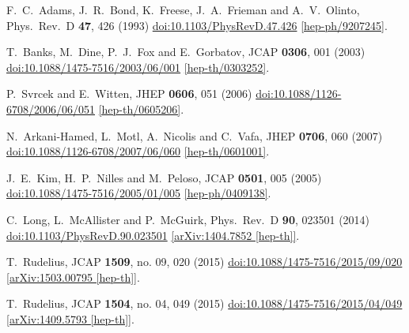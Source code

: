 \documentclass[12pt]{article}
\begin{document}
\begin{thebibliography}{99}
  F.~C.~Adams, J.~R.~Bond, K.~Freese, J.~A.~Frieman and A.~V.~Olinto,
  Phys.\ Rev.\ D {\bf 47}, 426 (1993)
  \href{https://dx.doi.org/10.1103/PhysRevD.47.426}{doi:10.1103/PhysRevD.47.426}
  \href{https://arxiv.org/abs/hep-ph/9207245}{[hep-ph/9207245]}.

  T.~Banks, M.~Dine, P.~J.~Fox and E.~Gorbatov,
  JCAP {\bf 0306}, 001 (2003)
  \href{https://dx.doi.org/10.1088/1475-7516/2003/06/001}{doi:10.1088/1475-7516/2003/06/001}
  \href{https://arxiv.org/abs/hep-th/0303252}{[hep-th/0303252]}.

  P.~Svrcek and E.~Witten,
  JHEP {\bf 0606}, 051 (2006)
  \href{https://dx.doi.org/10.1088/1126-6708/2006/06/051}{doi:10.1088/1126-6708/2006/06/051}
  \href{https://arxiv.org/abs/hep-th/0605206}{[hep-th/0605206]}.

  N.~Arkani-Hamed, L.~Motl, A.~Nicolis and C.~Vafa,
  JHEP {\bf 0706}, 060 (2007)
  \href{https://dx.doi.org/10.1088/1126-6708/2007/06/060}{doi:10.1088/1126-6708/2007/06/060}
  \href{https://arxiv.org/abs/hep-th/0601001}{[hep-th/0601001]}.

  J.~E.~Kim, H.~P.~Nilles and M.~Peloso,
  JCAP {\bf 0501}, 005 (2005)
  \href{https://dx.doi.org/10.1088/1475-7516/2005/01/005}{doi:10.1088/1475-7516/2005/01/005}
  \href{https://arxiv.org/abs/hep-ph/0409138}{[hep-ph/0409138]}.

  C.~Long, L.~McAllister and P.~McGuirk,
  Phys.\ Rev.\ D {\bf 90}, 023501 (2014)
  \href{https://dx.doi.org/10.1103/PhysRevD.90.023501}{doi:10.1103/PhysRevD.90.023501}
  \href{https://arxiv.org/abs/1404.7852}{[arXiv:1404.7852 [hep-th]]}.

  T.~Rudelius,
  JCAP {\bf 1509}, no. 09, 020 (2015)
  \href{https://dx.doi.org/10.1088/1475-7516/2015/09/020}{doi:10.1088/1475-7516/2015/09/020}
  \href{https://arxiv.org/abs/1503.00795}{[arXiv:1503.00795 [hep-th]]}.

  T.~Rudelius,
  JCAP {\bf 1504}, no. 04, 049 (2015)
  \href{https://dx.doi.org/10.1088/1475-7516/2015/04/049}{doi:10.1088/1475-7516/2015/04/049}
  \href{https://arxiv.org/abs/1409.5793}{[arXiv:1409.5793 [hep-th]]}.


\end{thebibliography}
\end{document}
